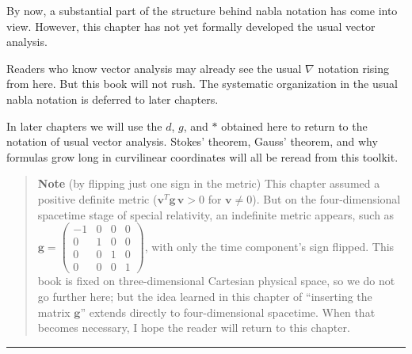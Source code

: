 By now, a substantial part of the structure behind nabla notation has
come into view. However, this chapter has not yet formally developed the
usual vector analysis.

Readers who know vector analysis may already see the usual \(\nabla\)
notation rising from here. But this book will not rush. The systematic
organization in the usual nabla notation is deferred to later chapters.

In later chapters we will use the \(d\), \(g\), and \(\ast\) obtained
here to return to the notation of usual vector analysis. Stokes'
theorem, Gauss' theorem, and why formulas grow long in curvilinear
coordinates will all be reread from this toolkit.

\begin{quote}
\textbf{Note} (by flipping just one sign in the metric) This chapter
assumed a positive definite metric
(\(\mathbf{v}^T \mathbf{g} \,\mathbf{v} > 0\) for
\(\mathbf{v} \neq 0\)). But on the four-dimensional spacetime stage of
special relativity, an indefinite metric appears, such as
\(\mathbf{g} = \begin{pmatrix} -1 & 0 & 0 & 0 \\ 0 & 1 & 0 & 0 \\ 0 & 0 & 1 & 0 \\ 0 & 0 & 0 & 1 \end{pmatrix}\),
with only the time component's sign flipped. This book is fixed on
three-dimensional Cartesian physical space, so we do not go further
here; but the idea learned in this chapter of ``inserting the matrix
\(\mathbf{g}\)'' extends directly to four-dimensional spacetime. When
that becomes necessary, I hope the reader will return to this chapter.
\end{quote}

\begin{center}\rule{0.5\linewidth}{0.5pt}\end{center}

